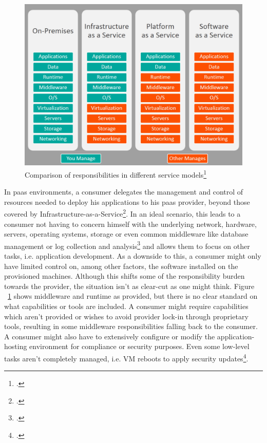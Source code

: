 \begin{figure}[H]
\centering
\includegraphics[scale=0.4]{pictures/ServiceComparison.jpg}
\caption{Comparison of responsibilities in different service models\protect\footcite[][, section 'Original reference image']{servicecomparison}}
\label{fig:servicecomparison}
\end{figure}

In \gls{paas} environments, a consumer delegates the management and control of resources needed to deploy his applications to his \gls{paas} provider, beyond those covered by Infrastructure-as-a-Service\footcite[][p. 2 to 3]{nistcloud}.
In an ideal scenario, this leads to a consumer not having to concern himself with the underlying network, hardware, servers, operating systems, storage or even common middleware like database management or log collection and analysis\footcite[][, section 'Advantages of PaaS']{msPaas} and allows them to focus on other tasks, i.e. application development.
As a downside to this, a consumer might only have limited control on, among other factors, the software installed on the provisioned machines. 
Although this shifts some of the responsibility burden towards the provider, the situation isn't as clear-cut as one might think. 
Figure ~\ref{fig:servicecomparison} shows middleware and runtime as provided, but there is no clear standard on what capabilities or tools are included.
A consumer might require capabilities which aren't provided or wishes to avoid provider lock-in through proprietary tools, 
resulting in some middleware responsibilities falling back to the consumer. 
A consumer might also have to extensively configure or modify the application-hosting environment for compliance or security purposes. 
Even some low-level tasks aren't completely managed, i.e. VM reboots to apply security updates\footcite[][, section 'Process Linux node updates and reboots using kured']{msVmReboot}.

